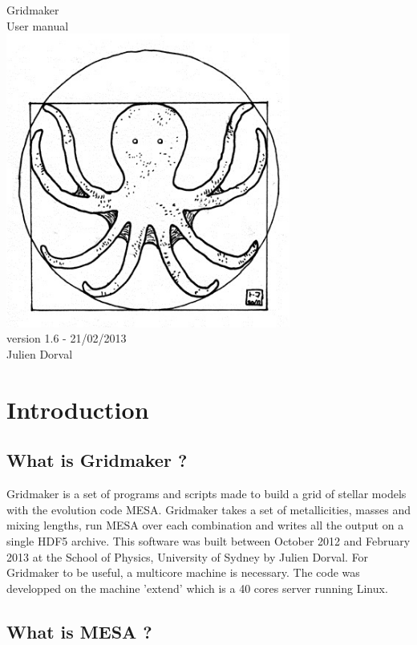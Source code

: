 \documentclass{report}
\begin{document}
\thispagestyle{empty}
\begin{center}
\Huge{Gridmaker}\\
\LARGE{User manual}\\
\vfill
\includegraphics[width=0.7\textwidth]{vitruve_octopus.jpg}\\
\vfill
version 1.6 - 21/02/2013\\
\vfill
\large Julien Dorval
\end{center}
\tableofcontents

\chapter{Introduction}
\section{What is Gridmaker ?}

Gridmaker is a set of programs and scripts made to build a grid of stellar models with the evolution code MESA. Gridmaker takes a set of metallicities,
masses and mixing lengths, run MESA over each combination and writes all the output on a single HDF5 archive. This software was built between October 2012 and February 2013
at the School of Physics, University of Sydney by Julien Dorval. For Gridmaker to be useful, a multicore machine is necessary. The code was developped on the machine 'extend'
which is a 40 cores server running Linux.

\section{What is MESA ?}
\end{document}
